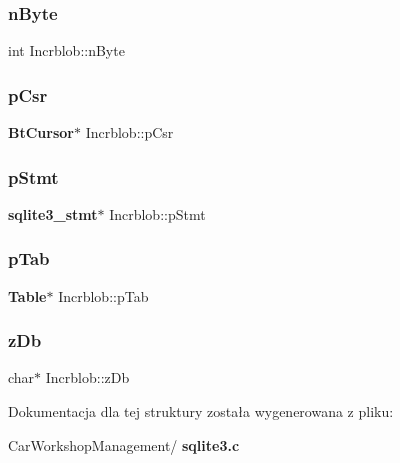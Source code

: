 \mbox{\label{struct_incrblob_ab1e1439df086208173fa97003f0ee02b}} 
\subsubsection{nByte}
{\footnotesize\ttfamily int Incrblob\+::n\+Byte}

\mbox{\label{struct_incrblob_af5a24b18473d1449c8c3fe7d826de59a}} 
\subsubsection{pCsr}
{\footnotesize\ttfamily \textbf{ Bt\+Cursor}$\ast$ Incrblob\+::p\+Csr}

\mbox{\label{struct_incrblob_a8b7b39c9372db552add74c69f14a61a3}} 
\subsubsection{pStmt}
{\footnotesize\ttfamily \textbf{ sqlite3\+\_\+stmt}$\ast$ Incrblob\+::p\+Stmt}

\mbox{\label{struct_incrblob_a8e8527f370fa5798363ab789f5abe549}} 
\subsubsection{pTab}
{\footnotesize\ttfamily \textbf{ Table}$\ast$ Incrblob\+::p\+Tab}

\mbox{\label{struct_incrblob_a908d355a5ea919ea43b0f8377b1d27de}} 
\subsubsection{zDb}
{\footnotesize\ttfamily char$\ast$ Incrblob\+::z\+Db}



Dokumentacja dla tej struktury została wygenerowana z pliku\+:\begin{DoxyCompactItemize}
\item 
Car\+Workshop\+Management/\textbf{ sqlite3.\+c}\end{DoxyCompactItemize}
